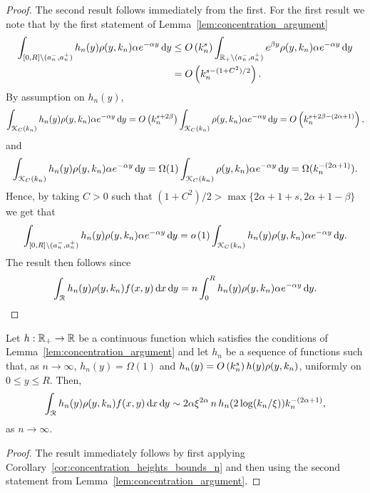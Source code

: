 \begin{proof}
The second result follows immediately from the first. For the first result we note that by the first statement of Lemma~\ref{lem:concentration_argument}
\begin{align*}
	\int_{[0,R] \setminus (a_n^-, a_n^+)} h_n(y) \rho(y,k_n) \alpha e^{-\alpha y} \operatorname{\mathrm{d}\hspace{-2pt}} y
	&\le O\left(k_n^s\right) \int_{{\mathbb R}_+ \setminus (a_n^-, a_n^+)} e^{\beta y } \rho(y,k_n) \alpha e^{-\alpha y} \operatorname{\mathrm{d}\hspace{-2pt}} y\\
	&= O\left(k_n^{s - (1+C^2)/2}\right).
\end{align*}
By assumption on $h_n(y)$,
\[
	\int_{{\mathcal K}_{C}(k_n)} h_n(y) \rho(y,k_n) \alpha e^{-\alpha y} \operatorname{\mathrm{d}\hspace{-2pt}} y 
	= O\left(k_n^{s+2\beta}\right) \int_{{\mathcal K}_{C}(k_n)} \rho(y,k_n) \alpha e^{-\alpha y} \operatorname{\mathrm{d}\hspace{-2pt}} y
	= O\left(k_n^{s+2\beta - (2\alpha + 1)}\right),
\]
and
\[
	\int_{{\mathcal K}_{C}(k_n)} h_n(y) \rho(y,k_n) \alpha e^{-\alpha y} \operatorname{\mathrm{d}\hspace{-2pt}} y 
	= \Omega(1) \int_{{\mathcal K}_{C}(k_n)} \rho(y,k_n) \alpha e^{-\alpha y} \operatorname{\mathrm{d}\hspace{-2pt}} y
	= \Omega(k_n^{-(2\alpha + 1)}).
\]
Hence, by taking $C > 0$ such that $(1+C^2)/2 > \max\{2\alpha + 1 + s, 2\alpha +1 - \beta\}$ we get that
\[
	\int_{[0,R] \setminus (a_n^-, a_n^+)} h_n(y) \rho(y,k_n) \alpha e^{-\alpha y} \operatorname{\mathrm{d}\hspace{-2pt}} y
	= o\left(1\right) \int_{{\mathcal K}_{C}(k_n)} h_n(y) \rho(y,k_n) \alpha e^{-\alpha y} \operatorname{\mathrm{d}\hspace{-2pt}} y.
\]
The result then follows since
\[
	\int_{{\mathcal R}} h_n(y) \rho(y,k_n) f(x,y) \operatorname{\mathrm{d}\hspace{-2pt}} x \operatorname{\mathrm{d}\hspace{-2pt}} y
	= n \int_{0}^{R} h_n(y) \rho(y,k_n) \alpha e^{-\alpha y} \operatorname{\mathrm{d}\hspace{-2pt}} y.
\]
\end{proof}

\begin{corollary}\label{cor:concentration_heights_asymptotics_n}
Let $h : {\mathbb R}_+ \to {\ensuremath{\mathbb R}}$ be a continuous function which  satisfies the conditions of Lemma~\ref{lem:concentration_argument} and let $h_n$ be a sequence of functions such that, as $n \to \infty$, $h_n(y) = \Omega(1)$ and $h_n(y) = O\left(k_n^{s}\right) h(y)\rho(y,k_n)$, uniformly on $0 \le y \le R$. Then,
\begin{equation}
	\int_{{\mathcal R}} h_n(y) \rho(y,k_n) f(x,y) \operatorname{\mathrm{d}\hspace{-2pt}} x \operatorname{\mathrm{d}\hspace{-2pt}} y 
	\sim 2\alpha \xi^{2\alpha} \, n \, h_n(2\log(k_n/\xi)) k_n^{-(2\alpha + 1)},
\end{equation}
as $n \to \infty$.
\end{corollary}

\begin{proof}
The result immediately follows by first applying Corollary~\ref{cor:concentration_heights_bounds_n} and then using the second statement from Lemma~\ref{lem:concentration_argument}.
\end{proof}

